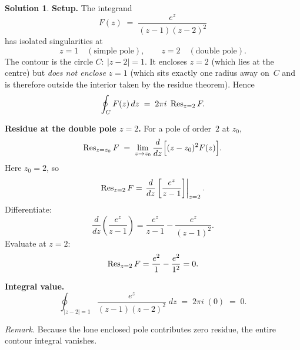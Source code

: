 \documentclass[12pt]{article}
\theoremstyle{definition} %
\newtheorem{solution}{Solution}
\theoremstyle{plain} %
\begin{document}
    \begin{solution}
      \textbf{Setup.}
      The integrand
      \[
         F(z)\;=\;\frac{e^{z}}{(z-1)(z-2)^{2}}
      \]
      has isolated singularities at
      \[
         z=1 \quad(\text{simple pole}), 
         \qquad
         z=2 \quad(\text{double pole}).
      \]
      The contour is the circle
      \(\displaystyle C:\ |z-2|=1\).
      It encloses \(z=2\) (which lies at the centre) but \emph{does not enclose}
      \(z=1\) (which sits exactly one radius away on~$C$ and is therefore outside
      the interior taken by the residue theorem).  
      Hence
      \[
         \oint_{C} F(z)\,dz
         \;=\;2\pi i\;\Res_{z=2}F.
      \]
      
      \bigskip
      \textbf{Residue at the double pole \(z=2\).}
      For a pole of order~\(2\) at \(z_{0}\),
      \[
         \Res_{z=z_{0}}F
         \;=\;
         \lim_{z\to z_{0}}
         \frac{d}{dz}\Bigl[(z-z_{0})^{2}F(z)\Bigr].
      \]
      Here \(z_{0}=2\), so
      \[
         \Res_{z=2}F
         =\left.\frac{d}{dz}
           \left[
              \frac{e^{z}}{z-1}
           \right]
           \right|_{z=2}.
      \]
      Differentiate:
      \[
         \frac{d}{dz}\!\left(\frac{e^{z}}{z-1}\right)
         =\frac{e^{z}}{z-1}-\frac{e^{z}}{(z-1)^{2}}.
      \]
      Evaluate at \(z=2\):
      \[
         \Res_{z=2}F
         =\frac{e^{2}}{1}-\frac{e^{2}}{1^{2}}
         =0.
      \]
      
      \bigskip
      \textbf{Integral value.}
      \[
         \oint_{|z-2|=1}\frac{e^{z}}{(z-1)(z-2)^{2}}\;dz
         \;=\;
         2\pi i\;(0)
         \;=\;
         \boxed{0}.
      \]
      
      \medskip
      \textit{Remark.}  
      Because the lone enclosed pole contributes zero residue,
      the entire contour integral vanishes.
      \end{solution}
\end{document}
